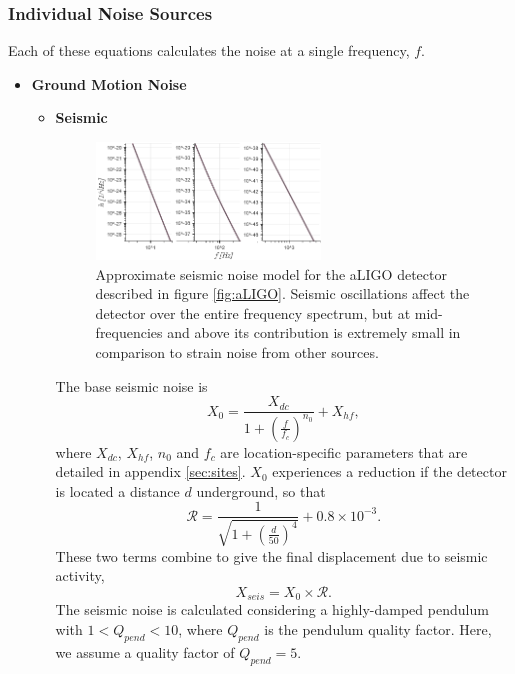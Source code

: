 \documentclass{article}
\begin{document}
\subsubsection{Individual Noise Sources}
Each of these equations calculates the noise at a single frequency, $f$.
\begin{itemize}
	\item \textbf{Ground Motion Noise} \par
    \begin{itemize}
    \item \textbf{Seismic} \par
       \begin{figure}[h!]
    \centering
    \includegraphics[width=0.6\textwidth]{SPQ_aLIGO_seismic.png}
    \caption{Approximate seismic noise model for the aLIGO detector described in figure \ref{fig:aLIGO}. Seismic oscillations affect the detector over the entire frequency spectrum, but at mid-frequencies and above its contribution is extremely small in comparison to strain noise from other sources.}
    \label{fig:seismic}
    \end{figure}
   The base seismic noise is
    \begin{equation}
    \label{eqn::baseseismic}
    X_0 = \frac{X_{dc}}{1 + \left(\frac{f}{f_c}\right)^{n_0}} + X_{hf},
    \end{equation}
    where $X_{dc}$, $X_{hf}$, $n_0$ and $f_c$ are location-specific parameters that are detailed in appendix \ref{sec:sites}. $X_0$ experiences a reduction if the detector is located a distance $d$ underground, so that
    \[
    \mathcal{R} = \frac{1}{\sqrt{1 + \left(\frac{d}{50}\right)^4}} + 0.8\times10^{-3} .
    \]
    These two terms combine to give the final displacement due to seismic activity,
    \begin{equation}
        X_{seis} = X_0 \times \mathcal{R}.
    \label{eq:Xseis}
    \end{equation}
    The seismic noise is calculated considering a highly-damped pendulum with $1 < Q_{pend} < 10$, where $Q_{pend}$ is the pendulum quality factor. Here, we assume a quality factor of $Q_{pend} = 5$. 
    

\end{itemize}
\end{itemize}
\end{document}
